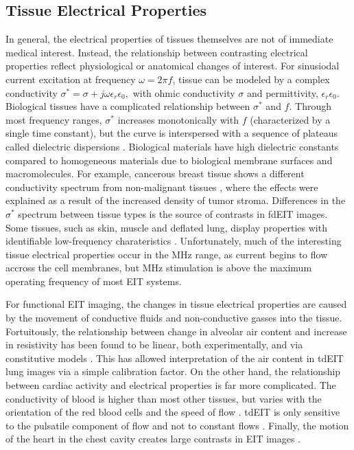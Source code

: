 \documentclass[10pt,journal]{IEEEtran}\def\TBLWIDA{15mm}\def\TBLWIDB{60mm}
\begin{document}
\subsection{Tissue Electrical Properties}

In general, the electrical properties of tissues themselves are not 
of immediate medical interest. Instead, the relationship between
contrasting electrical properties reflect physiological or anatomical
changes of interest. For sinusiodal current excitation at 
frequency $\omega=2\pi f$, tissue can be modeled by a
complex conductivity
$
\sigma^* = \sigma + j\omega\epsilon_r\epsilon_0,
$
with ohmic conductivity $\sigma$ and 
permittivity, $\epsilon_r\epsilon_0$.
Biological tissues have a complicated relationship between
$\sigma^*$ and $f$. Through most frequency ranges, $\sigma^*$
increases monotonically with $f$ (characterized
by a single time constant), but the curve is
 interspersed with a sequence of plateaus
called dielectric dispersions \cite{Gabriel1996Dielectric}. Biological materials
have high dielectric constants compared to homogeneous
materials due to biological membrane surfaces and macromolecules.
For example, cancerous breast tissue
shows a different conductivity spectrum
from non-malignant tissues \cite{Jossinet1998Breast},
where the effects were explained
as a result of the increased density of tumor stroma.
Differences in the $\sigma^*$ spectrum between
tissue types is the source of contrasts in fdEIT images.
Some tissues,
such as skin, muscle and deflated lung, display properties
with identifiable low-frequency charateristics 
\cite{Gabriel2009Frequencies}. Unfortunately, much of 
the interesting tissue electrical properties
occur in the MHz range, as current begins to flow accross the
cell membranes, but MHz stimulation is above the maximum operating frequency
of most EIT systems.

For functional EIT imaging, the changes in tissue
electrical properties are caused by the movement of
conductive fluids and non-conductive gasses into
the tissue. Fortuitously, the relationship between
change in alveolar air content and increase in 
resistivity has been found to be linear, both
experimentally,
 and via constitutive models \cite{Roth2015Correlation}.
This has allowed interpretation of the air 
content in  tdEIT lung images via a simple calibration factor.
On the other hand, the relationship between 
cardiac activity and electrical properties is far
more complicated. The conductivity of blood is 
higher than most other tissues, but varies with
the orientation of the red blood cells and the
speed of flow \cite{Hoetink2004Flow}.
tdEIT is only sensitive to the
pulsatile component of flow 
and not to constant flows \cite{Frerichs2017Chest}.
Finally, the motion of the heart in the chest cavity
creates large contrasts in EIT images \cite{Proenca2015Motion}.
\end{document}
